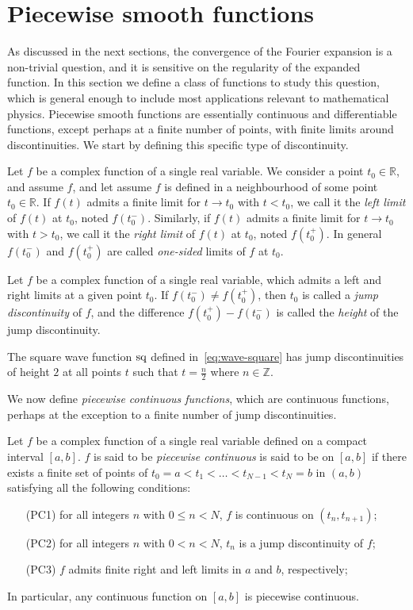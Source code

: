\section{Piecewise smooth functions}
As discussed in the next sections, the convergence of the Fourier expansion is a
non-trivial question, and it is sensitive on the regularity of the expanded function. In
this section we define a class of functions to study this question, which is general
enough to include most applications relevant to mathematical physics. Piecewise smooth
functions are essentially continuous and differentiable functions, except perhaps at a
finite number of points, with finite limits around discontinuities. We start by defining
this specific type of discontinuity.
\begin{definition}
  Let $f$ be a complex function of a single real variable. We consider a point
  $t_0\in\mathbb{R}$, and assume $f$, and let assume $f$ is defined in a neighbourhood of
  some point $t_0\in\mathbb{R}$. If $f(t)$ admits a finite limit for $t\to t_0$ with
  $t<t_0$, we call it the \emph{left limit} of $f(t)$ at $t_0$, noted $f(t_0^-)$.
  Similarly, if $f(t)$ admits a finite limit for $t\to t_0$ with $t>t_0$, we call it the
  \emph{right limit} of $f(t)$ at $t_0$, noted $f(t_0^+)$. In general $f(t_0^-)$ and
  $f(t_0^+)$ are called \emph{one-sided} limits of $f$ at $t_0$.
\end{definition}
\begin{definition}
  Let $f$ be a complex function of a single real variable, which admits a left and right
  limits at a given point $t_0$. If $f(t_0^-)\neq f(t_0^+)$, then $t_0$ is called a
  \emph{jump discontinuity} of $f$, and the difference $f(t_0^+)-f(t_0^-)$ is called the
  \emph{height} of the jump discontinuity.
\end{definition}
\begin{example}
  The square wave function $\operatorname{sq}$ defined in~\cref{eq:wave-square} has jump discontinuities
  of height $2$ at all points $t$ such that $t=\frac{n}{2}$ where $n\in\mathbb{Z}$.
\end{example}
We now define \emph{piecewise continuous functions}, which are continuous functions,
perhaps at the exception to a finite number of jump discontinuities.
\begin{definition}
  \label{def:pw-cont}
  Let $f$ be a complex function of a single real variable defined on a compact interval
  $[a,b]$. $f$ is said to be \emph{piecewise continuous} is said to be on $[a,b]$ if there
  exists a finite set of points of $t_0=a<t_1<\dots<t_{N-1}<t_N=b$ in $(a,b)$ satisfying
  all the following conditions:
  \begin{itemize}
    \item[(PC1)] for all integers $n$ with $0\leq n< N$, $f$ is continuous on
      $(t_n,t_{n+1})$;
    \item[(PC2)] for all integers $n$ with $0< n< N$, $t_n$ is a jump discontinuity of
      $f$;
    \item[(PC3)] $f$ admits finite right and left limits in $a$ and $b$, respectively;
  \end{itemize}
  In particular, any continuous function on $[a,b]$ is piecewise continuous.
\end{definition}
